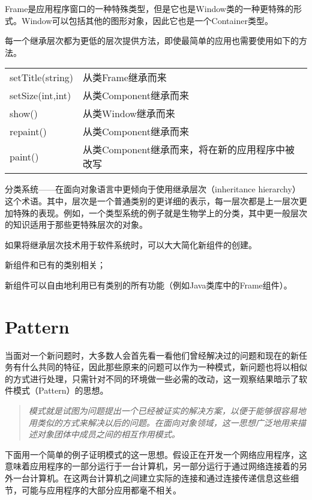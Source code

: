 Frame是应用程序窗口的一种特殊类型，但是它也是Window类的一种更特殊的形式。Window可以包括其他的图形对象，因此它也是一个Container类型。

每一个继承层次都为更低的层次提供方法，即使最简单的应用也需要使用如下的方法。

\begin{table}[htbp]
\centering
\begin{tabular}{ll}
setTitle(string)	&从类Frame继承而来\\
setSize(int,int)	&从类Component继承而来\\
show()			&从类Window继承而来\\
repaint()			&从类Component继承而来\\
paint()			&从类Component继承而来，将在新的应用程序中被改写\\
\end{tabular}
\end{table}



分类系统——在面向对象语言中更倾向于使用继承层次（inheritance hierarchy）这个术语。其中，层次是一个普通类别的更详细的表示，每一层次都是上一层次更加特殊的表现。例如，一个类型系统的例子就是生物学上的分类，其中更一般层次的知识适用于那些更特殊层次的对象。

如果将继承层次技术用于软件系统时，可以大大简化新组件的创建。

\begin{compactitem}
\item 新组件和已有的类别相关；
\item 新组件可以自由地利用已有类别的所有功能（例如Java类库中的Frame组件）。
\end{compactitem}


\chapter{Pattern}

当面对一个新问题时，大多数人会首先看一看他们曾经解决过的问题和现在的新任务有什么共同的特征，因此那些原来的问题可以作为一种模式，新问题也将以相似的方式进行处理，只需针对不同的环境做一些必需的改动，这一观察结果暗示了软件模式（Pattern）的思想。

\begin{quote}
\textsl{模式就是试图为问题提出一个已经被证实的解决方案，以便于能够很容易地用类似的方式来解决以后的问题。在面向对象领域，这一思想广泛地用来描述对象团体中成员之间的相互作用模式。}
\end{quote}

下面用一个简单的例子证明模式的这一思想。假设正在开发一个网络应用程序，这意味着应用程序的一部分运行于一台计算机，另一部分运行于通过网络连接着的另外一台计算机。在这两台计算机之间建立实际的连接和通过连接传递信息这些细节，可能与应用程序的大部分应用都毫不相关。

